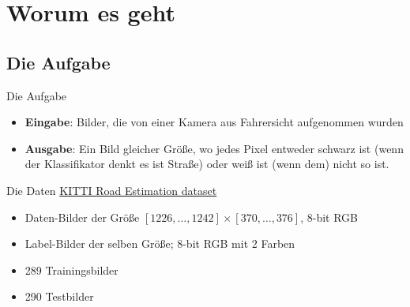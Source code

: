 \section{Worum es geht}

\subsection{Die Aufgabe}

\begin{frame}{Die Aufgabe}
    \begin{itemize}
        \item \textbf{Eingabe}: Bilder, die von einer Kamera aus Fahrersicht
              aufgenommen wurden
        \item \textbf{Ausgabe}: Ein Bild gleicher Größe, wo jedes Pixel
              entweder schwarz ist (wenn der Klassifikator denkt es ist Straße)
              oder weiß ist (wenn dem) nicht so ist.
    \end{itemize}
\end{frame}

\begin{frame}{Die Daten}
    \href{http://www.cvlibs.net/datasets/kitti/eval_road.php}{KITTI Road Estimation dataset}
    \begin{itemize}
        \item Daten-Bilder der Größe $[1226, \dots, 1242] \times [370, \dots, 376]$,
              8-bit RGB
        \item Label-Bilder der selben Größe; 8-bit RGB mit 2 Farben
        \item 289 Trainingsbilder
        \item 290 Testbilder
    \end{itemize}
\end{frame}

